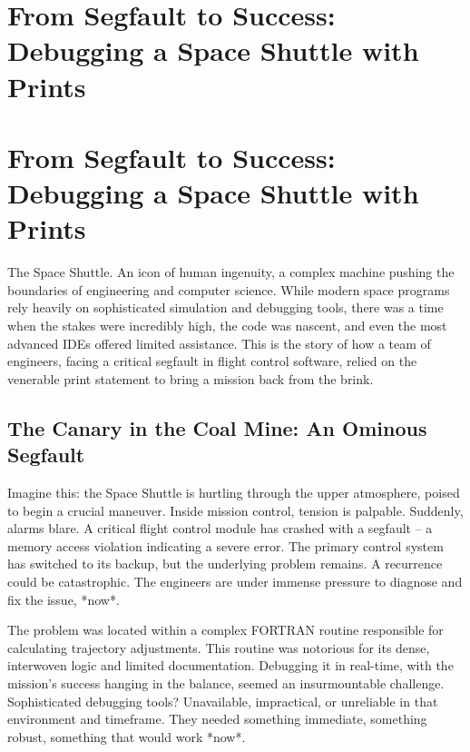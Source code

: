 \documentclass{article}
\begin{document}
{{{{%
\newpage

\section*{From Segfault to Success: Debugging a Space Shuttle with Prints} %
\label{chapter-8-3-From_Segfault_to_Success__Debugging_a_Sp}

\section*{From Segfault to Success: Debugging a Space Shuttle with Prints}

The Space Shuttle. An icon of human ingenuity, a complex machine pushing the boundaries of engineering and computer science. While modern space programs rely heavily on sophisticated simulation and debugging tools, there was a time when the stakes were incredibly high, the code was nascent, and even the most advanced IDEs offered limited assistance. This is the story of how a team of engineers, facing a critical segfault in flight control software, relied on the venerable print statement to bring a mission back from the brink.

\subsection*{The Canary in the Coal Mine: An Ominous Segfault}

Imagine this: the Space Shuttle is hurtling through the upper atmosphere, poised to begin a crucial maneuver. Inside mission control, tension is palpable. Suddenly, alarms blare. A critical flight control module has crashed with a segfault – a memory access violation indicating a severe error. The primary control system has switched to its backup, but the underlying problem remains. A recurrence could be catastrophic. The engineers are under immense pressure to diagnose and fix the issue, *now*.

The problem was located within a complex FORTRAN routine responsible for calculating trajectory adjustments. This routine was notorious for its dense, interwoven logic and limited documentation. Debugging it in real-time, with the mission's success hanging in the balance, seemed an insurmountable challenge. Sophisticated debugging tools? Unavailable, impractical, or unreliable in that environment and timeframe. They needed something immediate, something robust, something that would work *now*.

}}}}
\end{document}
